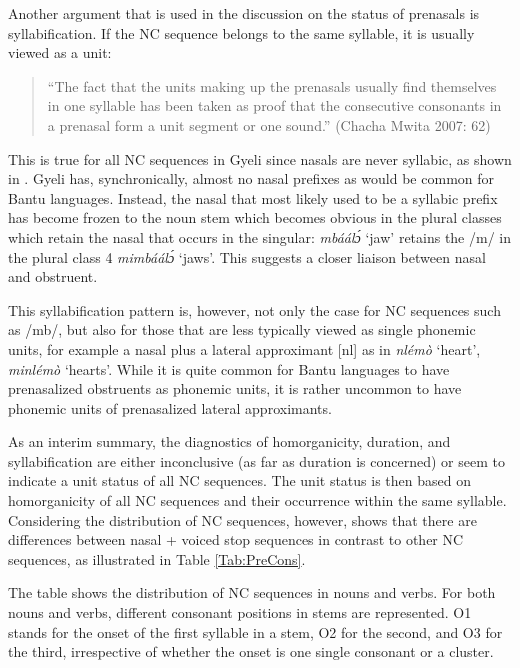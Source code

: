 Another argument that is used in the discussion on the status of prenasals is syllabification. If the NC sequence belongs to the same syllable, it is usually viewed as a unit: 

\begin{quote} ``The fact that the units making up the prenasals usually find themselves in one syllable has been taken as proof that the consecutive consonants in a prenasal form a unit segment or one sound.''  (Chacha Mwita 2007: 62)
\end{quote}

This is true for all NC sequences in Gyeli since nasals are never syllabic, as shown in . Gyeli has, synchronically, almost no nasal prefixes as would be common for Bantu languages. Instead, the nasal that most likely used to be a syllabic prefix has become frozen to the noun stem which becomes obvious in the plural classes which retain the nasal that occurs in the singular: {\itshape mbáálɔ́} `jaw' retains the /m/ in the plural class 4 {\itshape mimbáálɔ́} `jaws'. This suggests a closer liaison between nasal and obstruent.

This syllabification pattern is, however, not only the case for NC sequences such as /mb/, but also for those that are less typically viewed as single phonemic units, for example a nasal plus a lateral approximant [nl] as in {\itshape nlémò} `heart', {\itshape minlémò} `hearts'. While it is quite common for Bantu languages to have prenasalized obstruents as phonemic units, it is rather uncommon to have phonemic units of prenasalized lateral approximants. 

As an interim summary, the diagnostics of homorganicity, duration, and syllabification are either inconclusive (as far as duration is concerned) or seem to indicate a unit status of all NC sequences. The unit status is then based on homorganicity of all NC sequences and their occurrence within the same syllable. Considering the distribution of NC sequences, however, shows that there are differences between nasal + voiced stop sequences in contrast to other NC sequences, as illustrated in Table \ref{Tab:PreCons}. 


The table shows the distribution of NC sequences in nouns and verbs. For both nouns and verbs, different consonant positions in stems are represented. O1 stands for the onset of the first syllable in a stem, O2 for the second, and O3 for the third, irrespective of whether the onset is one single consonant or a cluster.

